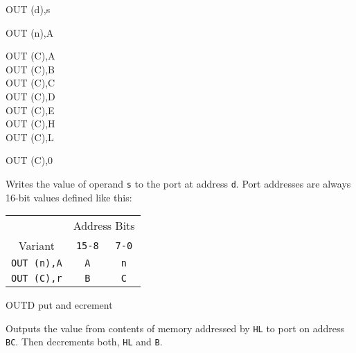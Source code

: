 \documentclass[12pt,twoside,openright,a4paper]{book}
\begin{document}
\begin{basedescript}{
	\desclabelstyle{\multilinelabel}
	\desclabelwidth{3cm}}
\begin{DetailItem}{OUT (d),s}
		\begin{DetailVariants}
			OUT (n),A
			
			\columnbreak
			OUT (C),A\\
			OUT (C),B\\
			OUT (C),C\\
			OUT (C),D\\
			OUT (C),E\\
			OUT (C),H\\
			OUT (C),L

			\columnbreak
			OUT (C),0\UNDOC
		\end{DetailVariants}

		Writes the value of operand {\tt s} to the port at address {\tt d}. Port addresses are always 16-bit values defined like this:

		\begin{tabular}{ccc}
			& \multicolumn{2}{c}{Address Bits} \\
			Variant & {\tt 15-8} & {\tt 7-0} \\
			\hline
			{\tt OUT (n),A} & {\tt A} & {\tt n} \\
			{\tt OUT (C),r} & {\tt B} & {\tt C} \\
		\end{tabular}
		\vspace{1ex} %

		\begin{DetailEffects}
			\FlagsOUTcr
		\end{DetailEffects}
		
		\begin{DetailTiming}
		\end{DetailTiming}


	\end{DetailItem}

	\label{DetailRefOUTD}
	\begin{DetailItem}{OUTD}
		{put and ecrement}
		{\SymOUTD}

		Outputs the value from contents of memory addressed by {\tt HL} to port on address {\tt BC}. Then decrements both, {\tt HL} and {\tt B}.


\end{DetailItem}
\end{basedescript}
\end{document}
